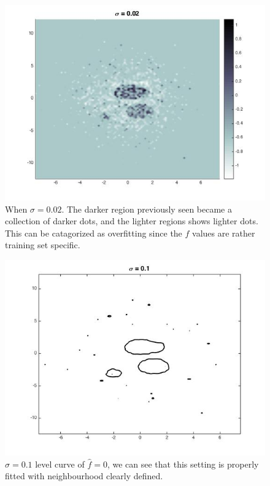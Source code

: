 \documentclass[twoside]{article}
\theoremstyle{definition}
\theoremstyle{definition}
\theoremstyle{remark}
\begin{document}
\begin{figure}[H]
\centering
\includegraphics[width=120mm]{sigma_002.jpg}
\caption{ When $\sigma = 0.02$. The darker region previously seen became a collection of darker dots, and the lighter regions shows lighter dots. This can be catagorized as overfitting since the $f$ values are rather training set specific.\label{problem2Pic5}}
\end{figure}


\begin{figure}[H]
\centering
\includegraphics[width=120mm]{sigma_1_level_curve.jpg}
\caption{ $\sigma = 0.1$ level curve of $\hat f = 0$, we can see that this setting is properly fitted with neighbourhood clearly defined. \label{problem2Pic6}}
\end{figure}
\end{document}
